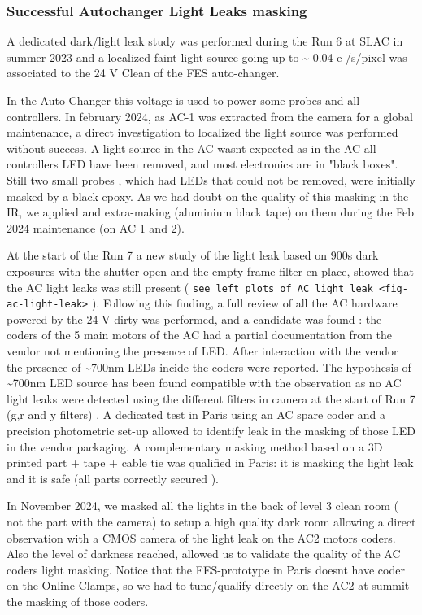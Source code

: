 \subsubsection{Successful Autochanger Light Leaks
masking}\label{successful-autochanger-light-leaks-masking}

A dedicated dark/light leak study was performed during the Run 6 at SLAC
in summer 2023 and a localized faint light source going up to
\textasciitilde{} 0.04 e-/s/pixel was associated to the 24 V Clean of
the FES auto-changer.

In the Auto-Changer this voltage is used to power some probes and all
controllers. In february 2024, as AC-1 was extracted from the camera for
a global maintenance, a direct investigation to localized the light
source was performed without success. A light source in the AC
wasn\textquotesingle t expected as in the AC all controllers LED have
been removed, and most electronics are in "black boxes". Still two small
probes , which had LEDs that could not be removed, were initially masked
by a black epoxy. As we had doubt on the quality of this masking in the
IR, we applied and extra-making (aluminium black tape) on them during
the Feb 2024 maintenance (on AC 1 and 2).

At the start of the Run 7 a new study of the light leak based on 900s
dark exposures with the shutter open and the empty frame filter en
place, showed that the AC light leaks was still present (
\texttt{see\ left\ plots\ of\ AC\ light\ leak\ \textless{}fig-ac-light-leak\textgreater{}}
). Following this finding, a full review of all the AC hardware powered
by the 24 V dirty was performed, and a candidate was found : the coders
of the 5 main motors of the AC had a partial documentation from the
vendor not mentioning the presence of LED. After interaction with the
vendor the presence of \textasciitilde700nm LEDs incide the coders were
reported. The hypothesis of \textasciitilde700nm LED source has been
found compatible with the observation as no AC light leaks were detected
using the different filters in camera at the start of Run 7 (g,r and y
filters) . A dedicated test in Paris using an AC spare coder and a
precision photometric set-up allowed to identify leak in the masking of
those LED in the vendor packaging. A complementary masking method based
on a 3D printed part + tape + cable tie was qualified in Paris: it is
masking the light leak and it is safe (all parts correctly secured ).

In November 2024, we masked all the lights in the back of level 3 clean
room ( not the part with the camera) to setup a high quality dark room
allowing a direct observation with a CMOS camera of the light leak on
the AC2 motors coders. Also the level of darkness reached, allowed us to
validate the quality of the AC coders light masking. Notice that the
FES-prototype in Paris doesn\textquotesingle t have coder on the Online
Clamps, so we had to tune/qualify directly on the AC2 at summit the
masking of those coders.

